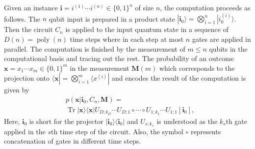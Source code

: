 \documentclass[prl,twocolumn,amsmath,amssymb,nofootinbib]{revtex4-1}
\newcommand\us[1]{^{(#1)}}
\renewcommand{\bra}[1] {\langle #1 |}
\renewcommand{\ket}[1] {| #1 \rangle}
\newcommand{\ketbra}[1]{ | #1 \rangle\!\langle #1 |}
\newcommand{\Tr} {\operatorname{Tr}}
\newcommand{\poly} {\operatorname{poly}}
\begin{document}
Given an instance $\mathbf{i}{=}i\us{1}\cdots i\us{n}{\in}\{0,1\}^n$ of size $n$, the computation proceeds as follows.
The $n$ qubit input is prepared in a product state $\ket{\mathbf{i}_0}{=}{\bigotimes}_{i=1}^n\ket{i_0\us{i}}$.
Then the circuit $C_n$ is applied to the input quantum state in a sequence of $D(n){=}\poly (n)$ time steps where in each step at most $n$ gates are applied in parallel.
The computation is finished by the measurement of $m{\leq} n$ qubits in the computational basis and tracing out the rest.
The probability of an outcome $\mathbf{x}{=}x_1\cdots x_m{\in}\{0,1\}^m$ in the measurement $\mathbf{M}(m)$ which corresponds to the projection onto $\bra{\mathbf{x}}{=}{\bigotimes}_{i=1}^m\bra{x\us{i}}$ and encodes the result of the computation is given by
%
\begin{equation}\label{eq:qcomp}
\begin{split}
& p(\mathbf{x}|\mathbf{i}_0,C_n,\mathbf{M}) = \\
& \Tr \ketbra{\mathbf{x}} U_{D;k_D}\cdots U_{D;1}\circ \cdots \circ U_{1;k_1}\cdots U_{1;1}[\mathbf{i}_0],
\end{split}
\end{equation}
%
Here, $\mathbf{i}_0$ is short for the projector $\ketbra{\mathbf{i}_0}$ and $U_{s;k_s}$ is understood as the $k_s$th gate applied in the $s$th time step of the circuit.
Also, the symbol $\circ$ represents concatenation of gates in different time steps.

\end{document}
